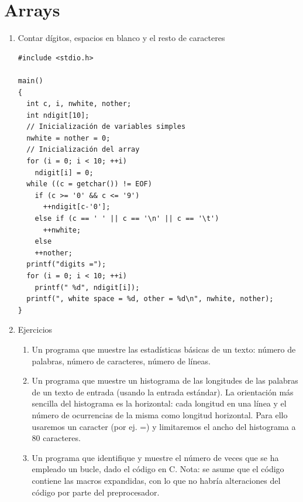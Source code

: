 \documentclass[a4paper,oneside]{article}
\begin{document}
\section{Arrays}
  \begin{enumerate}
  \item Contar dígitos, espacios en blanco y el resto de caracteres

    \begin{verbatim}
#include <stdio.h>

main()
{
  int c, i, nwhite, nother;
  int ndigit[10];
  // Inicialización de variables simples
  nwhite = nother = 0;
  // Inicialización del array
  for (i = 0; i < 10; ++i)
    ndigit[i] = 0;
  while ((c = getchar()) != EOF)
    if (c >= '0' && c <= '9')
      ++ndigit[c-'0'];
    else if (c == ' ' || c == '\n' || c == '\t')
      ++nwhite;
    else
    ++nother;
  printf("digits =");
  for (i = 0; i < 10; ++i)
    printf(" %d", ndigit[i]);
  printf(", white space = %d, other = %d\n", nwhite, nother);
}
    \end{verbatim}
  \item{Ejercicios}
    \begin{enumerate}
    \item Un programa que muestre las estadísticas básicas de un texto: número de palabras, número de caracteres, número de líneas.
    \item Un programa que muestre un histograma de las longitudes de las palabras de un texto de entrada (usando la entrada estándar). La orientación más sencilla del histograma es la horizontal: cada longitud en una línea y el número de ocurrencias de la misma como longitud horizontal. Para ello usaremos un caracter (por ej. =) y limitaremos el ancho del histograma a 80 caracteres.
    \item Un programa que identifique y muestre el número de veces que se ha empleado un bucle, dado el código en C. Nota: se asume que el código contiene las macros expandidas, con lo que no habría alteraciones del código por parte del preprocesador.
    \end{enumerate}
  \end{enumerate}
\end{document}
